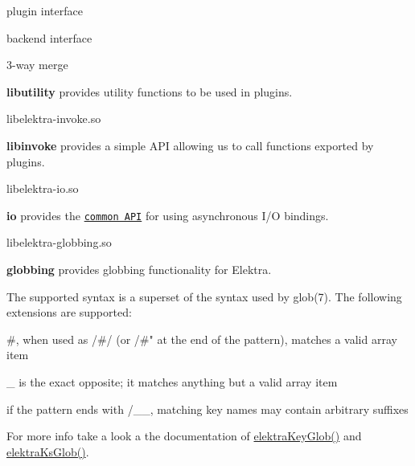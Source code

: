 \begin{DoxyItemize}
\item plugin interface
\item backend interface
\item 3-\/way merge
\end{DoxyItemize}

{\bfseries libutility} provides utility functions to be used in plugins.


\begin{DoxyCode}
libelektra-invoke.so
\end{DoxyCode}


{\bfseries libinvoke} provides a simple A\+PI allowing us to call functions exported by plugins.


\begin{DoxyCode}
libelektra-io.so
\end{DoxyCode}


{\bfseries io} provides the \href{https://doc.libelektra.org/api/latest/html/group__kdbio.html}{\tt common A\+PI} for using asynchronous I/O bindings.


\begin{DoxyCode}
libelektra-globbing.so
\end{DoxyCode}


{\bfseries globbing} provides globbing functionality for Elektra.

The supported syntax is a superset of the syntax used by {\ttfamily glob(7)}. The following extensions are supported\+:


\begin{DoxyItemize}
\item {\ttfamily \#}, when used as {\ttfamily /\#/} (or {\ttfamily /\#"} at the end of the pattern), matches a valid array item
\item {\ttfamily \+\_\+} is the exact opposite; it matches anything but a valid array item
\item if the pattern ends with {\ttfamily /\+\_\+\+\_\+}, matching key names may contain arbitrary suffixes
\end{DoxyItemize}

For more info take a look a the documentation of {\ttfamily \hyperlink{globbing_8c_ad7700821df72fc0fc3bfc336e4368d29}{elektra\+Key\+Glob()}} and {\ttfamily \hyperlink{globbing_8c_a85baa9c79325ad1bf08e95cd82a4daf6}{elektra\+Ks\+Glob()}}. 
